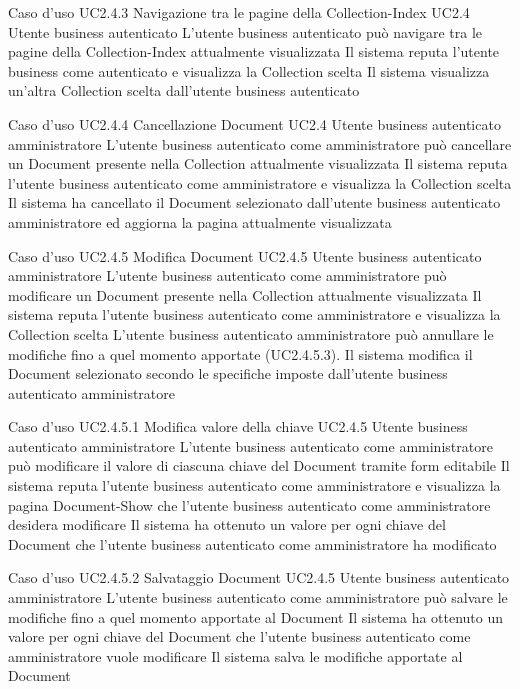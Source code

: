 \UCtitle
{Caso d'uso UC2.4.3}
{Navigazione tra le pagine della Collection-Index}
\UC
{UC2.4}
{Utente business autenticato}
{L'utente business autenticato può navigare tra le pagine della Collection-Index attualmente visualizzata}
{Il sistema reputa l'utente business come autenticato e visualizza la Collection scelta}
\post
{Il sistema visualizza un'altra Collection scelta dall'utente business autenticato}

\UCtitle
{Caso d'uso UC2.4.4}
{Cancellazione Document}
\UC
{UC2.4}
{Utente business autenticato amministratore}
{L'utente business autenticato come amministratore può cancellare un Document presente nella Collection attualmente visualizzata}
{Il sistema reputa l'utente business autenticato come amministratore e visualizza la Collection scelta}
\post
{Il sistema ha cancellato il Document selezionato dall'utente business autenticato amministratore ed aggiorna la pagina attualmente visualizzata}



\UCtitle
{Caso d'uso UC2.4.5}
{Modifica Document}
\UC
{UC2.4.5}
{Utente business autenticato amministratore}
{L'utente business autenticato come amministratore può modificare un Document presente nella Collection attualmente visualizzata}
{Il sistema reputa l'utente business autenticato come amministratore e visualizza la Collection scelta}
\estensioni
{L'utente business autenticato amministratore può annullare le modifiche fino a quel momento apportate (UC2.4.5.3).}
\post
{Il sistema modifica il Document selezionato secondo le specifiche imposte dall'utente business autenticato amministratore}


\UCtitle
{Caso d'uso UC2.4.5.1}
{Modifica valore della chiave}
\UC
{UC2.4.5}
{Utente business autenticato amministratore}
{L'utente business autenticato come amministratore può modificare il valore di ciascuna chiave del Document tramite form editabile}
{Il sistema reputa l'utente business autenticato come amministratore e visualizza la pagina Document-Show che l'utente business autenticato come amministratore desidera modificare}
\post
{Il sistema ha ottenuto un valore per ogni chiave del Document che l'utente business autenticato come amministratore ha modificato}

\UCtitle
{Caso d'uso UC2.4.5.2}
{Salvataggio Document}
\UC
{UC2.4.5}
{Utente business autenticato amministratore}
{L'utente business autenticato come amministratore può salvare le modifiche fino a quel momento apportate al Document}
{Il sistema ha ottenuto un valore per ogni chiave del Document che l'utente business autenticato come amministratore vuole modificare}
\post
{Il sistema salva le modifiche apportate al Document}

